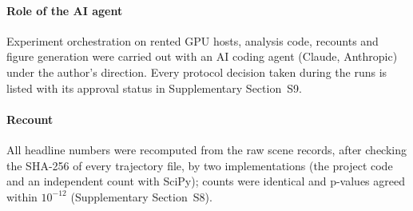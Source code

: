 \paragraph{Role of the AI agent} Experiment orchestration on rented GPU hosts, analysis code, recounts and figure generation were carried out with an AI coding agent (Claude, Anthropic) under the author's direction. Every protocol decision taken during the runs is listed with its approval status in Supplementary Section~S9.

\paragraph{Recount} All headline numbers were recomputed from the raw scene records, after checking the SHA-256 of every trajectory file, by two implementations (the project code and an independent count with SciPy); counts were identical and p-values agreed within $10^{-12}$ (Supplementary Section~S8).
